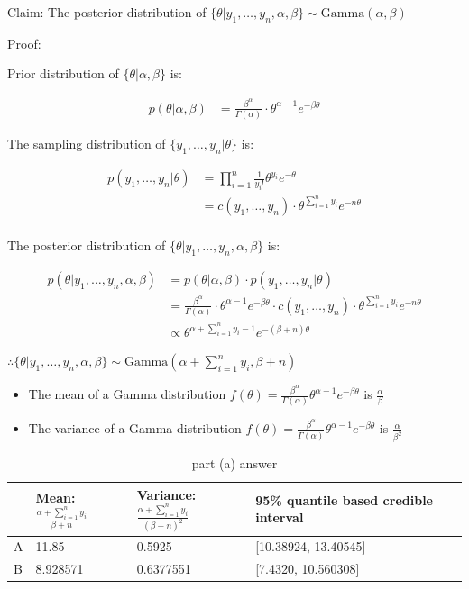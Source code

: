 \documentclass[11pt]{article}
\begin{document}
Claim: The posterior distribution of $\{\theta|y_1,\ldots,y_n,\alpha, \beta\} \sim \text{Gamma}\left( \alpha, \beta \right) $ 

Proof:

Prior distribution of $\{\theta|\alpha, \beta\}$ is: 

\begin{align*}
p(\theta|\alpha, \beta)
&= \frac{\beta^\alpha}{\Gamma(\alpha)}\cdot \theta^{\alpha-1}e^{-\beta\theta}
\end{align*}

The sampling distribution of $\{y_1,\ldots,y_n|\theta\}$ is:

\begin{align*}
p(y_1,\ldots,y_n|\theta)
&=\prod_{i=1}^{n} \frac{1}{y_i!}\theta^{y_i}e^{-\theta}\\
&=c(y_1,\ldots,y_n)\cdot \theta^{\sum_{i=1}^{n} y_i}e^{-n\theta}\\
\end{align*}

The posterior distribution of $\{\theta|y_1,\ldots,y_n, \alpha, \beta\}$ is:

\begin{align*}
p(\theta|y_1,\ldots,y_n, \alpha, \beta)
&=p(\theta|\alpha, \beta)\cdot p(y_1,\ldots,y_n|\theta)\\
&=\frac{\beta^\alpha}{\Gamma(\alpha)}\cdot \theta^{\alpha-1}e^{-\beta\theta}\cdot c(y_1,\ldots,y_n)\cdot \theta^{\sum_{i=1}^{n} y_i}e^{-n\theta}\\
&\propto \theta^{\alpha+\sum_{i=1}^{n} y_i -1}e^{-(\beta+n)\theta}
\end{align*}

$\therefore \{\theta|y_1,\ldots,y_n, \alpha, \beta\} \sim \text{Gamma}(\alpha+\sum_{i=1}^{n} y_i, \beta+n)$

\begin{itemize}
\item The mean of a Gamma distribution $f(\theta) = \frac{\beta^{\alpha}}{\Gamma(\alpha)}\theta^{\alpha-1}e^{-\beta \theta}$ is $\frac{\alpha}{\beta}$
\item The variance of a Gamma distribution $f(\theta) = \frac{\beta^{\alpha}}{\Gamma(\alpha)}\theta^{\alpha-1}e^{-\beta \theta}$ is $\frac{\alpha}{\beta^2}$
\end{itemize}

\begin{table}[htpb]
	\centering
	\caption{part (a) answer}
	\label{tab:label}
	\begin{tabular}{llll}
	\toprule
	&Mean: $\frac{\alpha+\sum_{i=1}^{n} y_i}{\beta+n}$  & Variance: $\frac{\alpha+\sum_{i=1}^{n} y_i}{(\beta+n)^2}$ & 95\% quantile based credible interval\\
	\midrule
		A&11.85& 0.5925& [10.38924, 13.40545]\\
		B&8.928571&0.6377551&[7.4320, 10.560308]\\
	\bottomrule
	\end{tabular}
\end{table}
\end{document}
